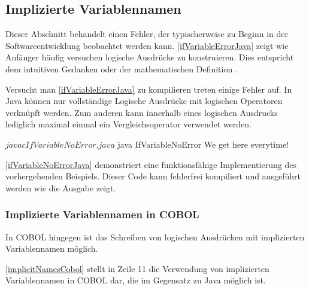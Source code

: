 \subsection{Implizierte Variablennamen}

Dieser Abschnitt behandelt einen Fehler, der typischerweise zu Beginn in der Softwareentwicklung beobachtet werden kann. \autoref{ifVariableErrorJava} zeigt wie Anfänger häufig versuchen logische Ausdrücke zu konstruieren. Dies entspricht dem intuitiven Gedanken  oder der mathematischen Definition .\\

\sepCodeAndOutputCheck
\begin{shellwindow}
$ javac -Xmaxerrs 3 IfVariableError.java 
IfVariableError.java:4: error: > expected
        if (System.currentTimeMillis() > 0 && < Long.MAX_VALUE) {
                                                              ^
IfVariableError.java:4: error: ')' expected
        if (System.currentTimeMillis() > 0 && < Long.MAX_VALUE) {
                                                               ^
IfVariableError.java:8: error: illegal start of type
        if (0 < System.currentTimeMillis() < Long.MAX_VALUE) {
        ^
3 errors
\end{shellwindow}

Versucht man \autoref{ifVariableErrorJava} zu kompilieren treten einige Fehler auf. In Java können nur vollständige Logische Ausdrücke mit logischen Operatoren verknüpft werden. Zum anderen kann innerhalb eines logischen Ausdrucks lediglich maximal einmal ein Vergleichsoperator verwendet werden. \\

\sepCodeAndOutputCheck
\begin{shellwindow}
$ javac IfVariableNoError.java 
$ java IfVariableNoError
We get here everytime!
\end{shellwindow}

\autoref{ifVariableNoErrorJava} demonstriert eine funktionsfähige Implementierung des vorhergehenden Beispiels. Dieser Code kann fehlerfrei kompiliert und ausgeführt werden wie die Ausgabe zeigt.\\

\subsubsection*{Implizierte Variablennamen in COBOL}

In COBOL hingegen ist das Schreiben von logischen Ausdrücken mit implizierten Variablennamen möglich.\\


\autoref{implicitNamesCobol} stellt in Zeile 11 die Verwendung von implizierten Variablennamen in COBOL dar, die im Gegensatz zu Java möglich ist.
